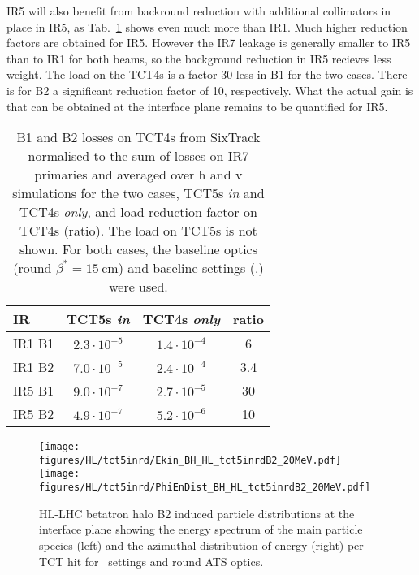 IR5 will also benefit from backround reduction with additional collimators in place in IR5, as Tab.~\ref{tab:compLosses} shows even much more than IR1. Much higher reduction factors are obtained for IR5. However the IR7 leakage is generally smaller to IR5 than to IR1 for both beams, so the background reduction in IR5 recieves less weight. The load on the TCT4s is a factor 30 less in B1 for the two cases. There is for B2 a significant reduction factor of 10, respectively. What the actual gain is that can be obtained at the interface plane remains to be quantified for IR5. 


\begin{table}%
   \centering
   \caption{B1 and B2 losses on TCT4s from SixTrack normalised to the sum of losses on IR7 primaries and averaged over h and v simulations for the two cases, TCT5s \textit{in} and TCT4s \textit{only}, and load reduction factor on TCT4s (ratio). The load on TCT5s is not shown. For both cases, the baseline optics (round $\beta^* = 15~$cm) and baseline settings (\twosigmaret.) were used.} 
   \begin{tabular}{l|c|c|c}
       \hline
       IR & TCT5s \textit{in} &  TCT4s \textit{only} & ratio \\
       \hline\hline
       IR1 B1 & $2.3 \cdot 10^{-5}$ & $1.4 \cdot 10^{-4}$ & 6\\
       IR1 B2 & $7.0 \cdot 10^{-5}$ & $2.4 \cdot 10^{-4}$ & 3.4 \\ 
       IR5 B1 & $9.0 \cdot 10^{-7}$ & $2.7 \cdot 10^{-5}$ & 30\\
       IR5 B2 & $4.9 \cdot 10^{-7}$ & $5.2 \cdot 10^{-6}$ & 10\\
       \hline
   \end{tabular}
   \label{tab:compLosses}
\end{table}




\begin{figure}
\begin{center}
\texttt{[image: figures/HL/tct5inrd/Ekin\_BH\_HL\_tct5inrdB2\_20MeV.pdf]}
\texttt{[image: figures/HL/tct5inrd/PhiEnDist\_BH\_HL\_tct5inrdB2\_20MeV.pdf]}
\end{center}
\vspace{-0.6cm}
 \caption{HL-LHC betatron halo B2 induced particle distributions at the interface plane showing the energy spectrum of the main particle species (left) and the azimuthal distribution of energy (right) per TCT hit for \twosigmaret~settings and round ATS optics.}
  \label{tct5inrdb2retr}
\end{figure}



